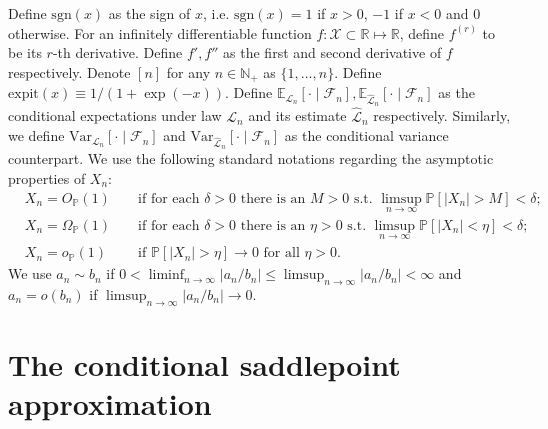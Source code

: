 \documentclass[12pt]{article}
\theoremstyle{definition}
\def\P{\mathbb{P}}
\def\sgn{\mathrm{sgn}}
\def\P{\mathbb{P}}
\newcommand{\E}{\mathbb E}								%
\newcommand{\V}{\mathrm{Var}}							%
\renewcommand{\P}{\mathbb{P}}							%
\newcommand{\expit}{\mathrm{expit}}                 	%
\newcommand{\law}{\mathcal L}							%
\newcommand{\lawhat}{\widehat{\mathcal L}}				%
\begin{document}
  
  Define $\sgn(x)$ as the sign of $x$, i.e. $\sgn(x)=1$ if $x>0$, $-1$ if $x<0$ and $0$ otherwise. For an infinitely differentiable function $f:\mathcal{X}\subset\mathbb{R}\mapsto\mathbb{R}$, define $f^{(r)}$ to be its $r$-th derivative. Define $f',f''$ as the first and second derivative of $f$ respectively. Denote $[n]$ for any $n\in\mathbb{N}_+$ as $\{1,\ldots,n\}$. Define $\expit(x)\equiv 1/ (1+\exp(-x))$. Define $\E_{\law_n}[\cdot\mid\mathcal{F}_n],\E_{\lawhat_n}[\cdot\mid\mathcal{F}_n]$ as the conditional expectations under law $\law_n$ and its estimate $\lawhat_n$ respectively. Similarly, we define $\V_{\law_n}[\cdot\mid\mathcal{F}_n]$ and $\V_{\lawhat_n}[\cdot\mid\mathcal{F}_n]$ as the conditional variance counterpart. We use the following standard notations regarding the asymptotic properties of $X_n$:
  \begin{align*}
	&X_n = O_{\P}(1) &&\text{ if for each } \delta > 0 \text{ there is an } M > 0 \text{ s.t. } \limsup_{n \rightarrow \infty}\P[|X_n| > M] < \delta; \\
	&X_n = \Omega_{\P}(1) &&\text{ if for each } \delta > 0 \text{ there is an } \eta > 0 \text{ s.t. } \limsup_{n \rightarrow \infty}\P[|X_n| < \eta] < \delta;\\
	&X_n = o_{\P}(1) &&\text{ if } \P[|X_n| > \eta] \rightarrow 0 \text{ for all } \eta > 0.
  \end{align*}
  We use $a_n\sim b_n$ if $0<\liminf_{n\rightarrow\infty}|a_n/b_n|\leq\limsup_{n\rightarrow\infty}|a_n/b_n|<\infty$ and $a_n=o(b_n)$ if $\limsup_{n\rightarrow\infty}|a_n/b_n|\rightarrow0$. 
  
  \section{The conditional saddlepoint approximation}\label{sec:conditional-spa}
  
\end{document}

